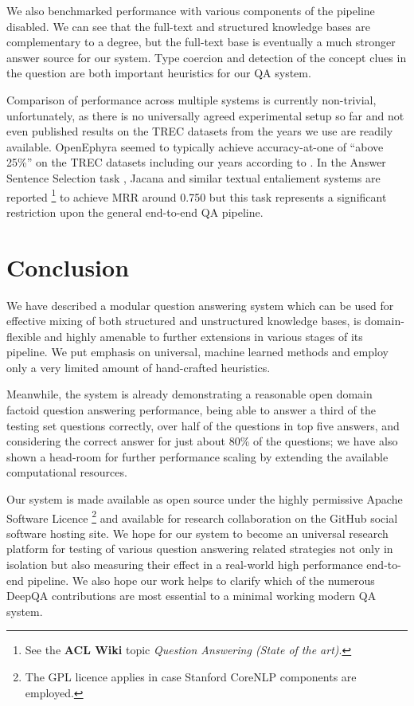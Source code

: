 \documentclass{poster15}
\begin{document}
We also benchmarked performance with various components of the pipeline
disabled.  We can see that the full-text and structured knowledge bases
are complementary to a degree, but the full-text base is eventually
a much stronger answer source for our system.  Type coercion and detection
of the concept clues in the question are both important heuristics for
our QA system.

Comparison of performance across multiple systems is currently non-trivial,
unfortunately, as there is no universally agreed experimental setup so far
and not even published results on the TREC datasets
from the years we use are readily available.
OpenEphyra seemed to typically achieve accuracy-at-one of ``above 25\%'' on
the TREC datasets including our years according to \cite{Ephyra2006}.
In the Answer Sentence Selection task \cite{WangQAGrammar},
Jacana and similar textual entaliement systems are reported%
\footnote{See the \textbf{ACL Wiki} topic \textit{Question Answering (State of the art)}.}
to achieve MRR around 0.750 but this task represents
a significant restriction upon the general end-to-end QA pipeline.


\section{Conclusion}
\label{sec:conclusion}

We have described a modular question answering system which can be used
for effective mixing of both structured and unstructured knowledge bases,
is domain-flexible and highly amenable to further extensions in various
stages of its pipeline.  We put emphasis on universal, machine learned
methods and employ only a very limited amount of hand-crafted heuristics.

Meanwhile, the system is already demonstrating a reasonable open domain
factoid question answering performance, being able to answer a third
of the testing set questions correctly, over half of the questions
in top five answers, and considering
the correct answer for just about 80\% of the questions;
we have also shown a head-room for further
performance scaling by extending the available computational resources.

Our system is made available as open source under the highly permissive
Apache Software Licence%
\footnote{The GPL licence applies in case Stanford CoreNLP components are employed.}
and available for research collaboration on the GitHub social software hosting site.
We hope for our system to become an universal research platform for testing
of various question answering related strategies not only in isolation but also
measuring their effect in a real-world high performance end-to-end pipeline.
We also hope our work helps to clarify which of the numerous DeepQA
contributions are most essential to a minimal working modern QA system.
\end{document}
